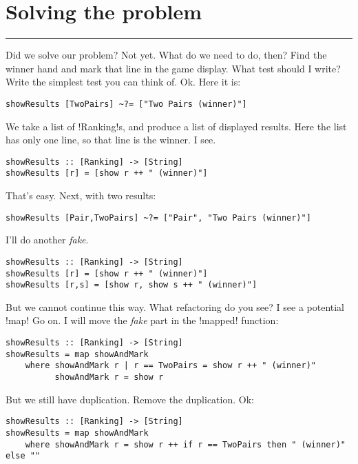 \newpage
\section{Solving the problem} 
\vspace{10cm}
\hrule

\lhQ Did we solve our problem?
\lhA Not yet. 
\lhN What do we need to do, then?
\lhA Find the winner hand and mark that line in the game display.
\lhN What test should I write?
\lhA Write the simplest test you can think of.
\lhN Ok. Here it is:
\begin{lstlisting}[frame=single]
showResults [TwoPairs] ~?= ["Two Pairs (winner)"] 
\end{lstlisting}
We take a list of \il!Ranking!s, and produce a list of displayed results. Here the list has only one line, so that line is the winner.
\lhA \error I see. 
\begin{lstlisting}[frame=single]
showResults :: [Ranking] -> [String]
showResults [r] = [show r ++ " (winner)"]
\end{lstlisting}
\success That's easy.
\lhN Next, with two results:
\begin{lstlisting}[frame=single]
showResults [Pair,TwoPairs] ~?= ["Pair", "Two Pairs (winner)"]  
\end{lstlisting}
\lhA \failure I'll do another \emph{fake}.
\begin{lstlisting}[frame=single]
showResults :: [Ranking] -> [String]
showResults [r] = [show r ++ " (winner)"]
showResults [r,s] = [show r, show s ++ " (winner)"]
\end{lstlisting}
\success But we cannot continue this way.
\lhN What refactoring do you see?
\lhA I see a potential \il!map!
\lhN Go on.
\lhA I will move the \emph{fake} part in the \il!mapped! function:
\begin{lstlisting}[frame=single]
showResults :: [Ranking] -> [String]
showResults = map showAndMark
    where showAndMark r | r == TwoPairs = show r ++ " (winner)"
          showAndMark r = show r
\end{lstlisting}
\success But we still have duplication.
\lhN Remove the duplication.
\lhA Ok:
\begin{lstlisting}[frame=single]
showResults :: [Ranking] -> [String]
showResults = map showAndMark
    where showAndMark r = show r ++ if r == TwoPairs then " (winner)" else ""
\end{lstlisting}
